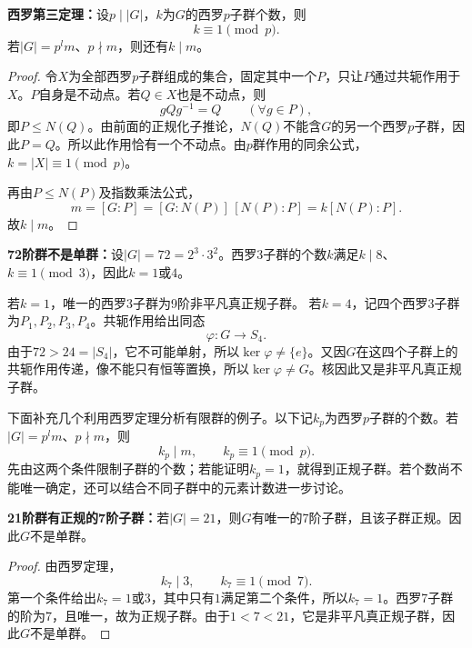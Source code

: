 \begin{theorem}\label{p2:sylow-three}
\textbf{西罗第三定理：}设$p\mid|G|$，$k$为$G$的西罗$p$子群个数，则
\[
k\equiv1\pmod p.
\]
若$|G|=p^lm$、$p\nmid m$，则还有$k\mid m$。
\end{theorem}
\begin{proof}
令$X$为全部西罗$p$子群组成的集合，固定其中一个$P$，只让$P$通过共轭作用于$X$。$P$自身是不动点。若$Q\in X$也是不动点，则
\[
gQg^{-1}=Q\qquad(\forall g\in P),
\]
即$P\leq N(Q)$。由前面的正规化子推论，$N(Q)$不能含$G$的另一个西罗$p$子群，因此$P=Q$。所以此作用恰有一个不动点。由$p$群作用的同余公式，$k=|X|\equiv1\pmod p$。

再由$P\leq N(P)$及指数乘法公式，
\[
m=[G:P]=[G:N(P)]\,[N(P):P]=k[N(P):P].
\]
故$k\mid m$。
\end{proof}

\begin{example}
\textbf{72阶群不是单群：}设$|G|=72=2^3\cdot3^2$。西罗3子群的个数$k$满足$k\mid8$、$k\equiv1\pmod3$，因此$k=1$或$4$。

若$k=1$，唯一的西罗3子群为9阶非平凡真正规子群。
若$k=4$，记四个西罗3子群为$P_1,P_2,P_3,P_4$。共轭作用给出同态
\[
\varphi:G\longrightarrow S_4.
\]
由于$72>24=|S_4|$，它不可能单射，所以$\ker\varphi\ne\{e\}$。又因$G$在这四个子群上的共轭作用传递，像不能只有恒等置换，所以$\ker\varphi\ne G$。核因此又是非平凡真正规子群。
\end{example}

下面补充几个利用西罗定理分析有限群的例子。以下记$k_p$为西罗$p$子群的个数。若$|G|=p^lm$、$p\nmid m$，则
\[
k_p\mid m,\qquad k_p\equiv1\pmod p.
\]
先由这两个条件限制子群的个数；若能证明$k_p=1$，就得到正规子群。若个数尚不能唯一确定，还可以结合不同子群中的元素计数进一步讨论。

\begin{example}
\textbf{21阶群有正规的7阶子群：}若$|G|=21$，则$G$有唯一的7阶子群，且该子群正规。因此$G$不是单群。
\end{example}
\begin{proof}
由西罗定理，
\[
k_7\mid3,\qquad k_7\equiv1\pmod7.
\]
第一个条件给出$k_7=1$或$3$，其中只有$1$满足第二个条件，所以$k_7=1$。西罗7子群的阶为7，且唯一，故为正规子群。由于$1<7<21$，它是非平凡真正规子群，因此$G$不是单群。
\end{proof}


